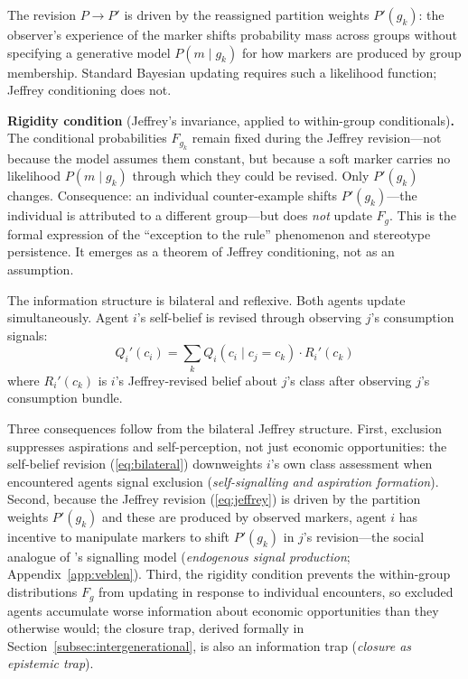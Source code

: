 \documentclass[12pt,a4paper]{article}
\theoremstyle{definition}
\numberwithin{proposition}{subsection}
\begin{document}
The revision $P \to P'$ is driven by the reassigned partition
weights $P'(g_k)$: the observer's experience of the marker shifts
probability mass across groups without specifying a generative model
$P(m \mid g_k)$ for how markers are produced by group membership.
Standard Bayesian updating requires such a likelihood function;
Jeffrey conditioning does not.

\textbf{Rigidity condition} (Jeffrey's invariance, applied to within-group conditionals)\textbf{.} The conditional probabilities
$F_{g_k}$ remain fixed during the Jeffrey revision---not because the
model assumes them constant, but because a soft marker carries no
likelihood $P(m \mid g_k)$ through which they could be revised. Only
$P'(g_k)$ changes. Consequence: an individual counter-example shifts
$P'(g_k)$---the individual is attributed to a different group---but
does \emph{not} update $F_g$. This is the formal
expression of the ``exception to the rule'' phenomenon and stereotype
persistence. It emerges as a theorem of Jeffrey conditioning, not as
an assumption.

The information structure is bilateral and reflexive. Both agents
update simultaneously. Agent $i$'s self-belief is revised through
observing $j$'s consumption signals:
\begin{equation}
  Q_i'(c_i) = \sum_{k} Q_i(c_i \mid c_j = c_k) \cdot R_i'(c_k)
  \label{eq:bilateral}
\end{equation}
where $R_i'(c_k)$ is $i$'s Jeffrey-revised belief about $j$'s class
after observing $j$'s consumption bundle.

Three consequences follow from the bilateral Jeffrey structure.
First, exclusion suppresses aspirations and self-perception, not
just economic opportunities: the self-belief revision
(\ref{eq:bilateral}) downweights $i$'s own class assessment when
encountered agents signal exclusion (\emph{self-signalling and
aspiration formation}). Second, because the Jeffrey revision
(\ref{eq:jeffrey}) is driven by the partition weights $P'(g_k)$ and
these are produced by observed markers, agent $i$ has incentive to
manipulate markers to shift $P'(g_k)$ in $j$'s revision---the social
analogue of \citet{Spence1973}'s signalling model
(\emph{endogenous signal production}; Appendix~\ref{app:veblen}).
Third, the rigidity condition prevents the within-group
distributions $F_g$ from updating in response to individual
encounters, so excluded agents accumulate worse information about
economic opportunities than they otherwise would; the closure trap,
derived formally in Section~\ref{subsec:intergenerational}, is also
an information trap (\emph{closure as epistemic trap}).
\end{document}
